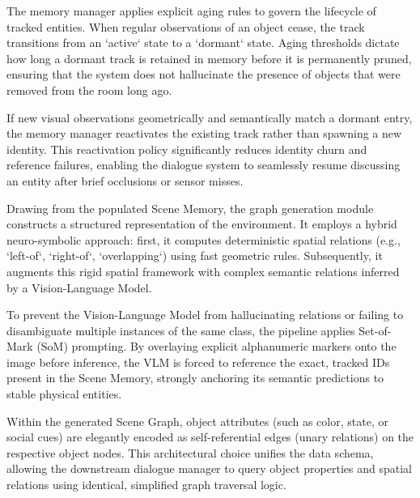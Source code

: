 The memory manager applies explicit aging rules to govern the lifecycle of tracked entities. When regular observations of an object cease, the track transitions from an `active` state to a `dormant` state. Aging thresholds dictate how long a dormant track is retained in memory before it is permanently pruned, ensuring that the system does not hallucinate the presence of objects that were removed from the room long ago.

If new visual observations geometrically and semantically match a dormant entry, the memory manager reactivates the existing track rather than spawning a new identity. This reactivation policy significantly reduces identity churn and reference failures, enabling the dialogue system to seamlessly resume discussing an entity after brief occlusions or sensor misses.

Drawing from the populated Scene Memory, the graph generation module constructs a structured representation of the environment. It employs a hybrid neuro-symbolic approach: first, it computes deterministic spatial relations (e.g., `left-of`, `right-of`, `overlapping`) using fast geometric rules. Subsequently, it augments this rigid spatial framework with complex semantic relations inferred by a Vision-Language Model.

To prevent the Vision-Language Model from hallucinating relations or failing to disambiguate multiple instances of the same class, the pipeline applies Set-of-Mark (SoM) prompting. By overlaying explicit alphanumeric markers onto the image before inference, the VLM is forced to reference the exact, tracked IDs present in the Scene Memory, strongly anchoring its semantic predictions to stable physical entities.

Within the generated Scene Graph, object attributes (such as color, state, or social cues) are elegantly encoded as self-referential edges (unary relations) on the respective object nodes. This architectural choice unifies the data schema, allowing the downstream dialogue manager to query object properties and spatial relations using identical, simplified graph traversal logic.

